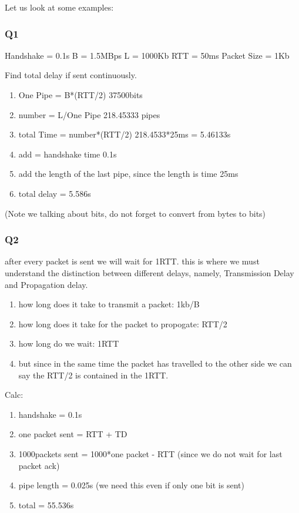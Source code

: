 \documentclass[11pt, a4paper]{article}
\begin{document}
Let us look at some examples:
\subsubsection{Q1}
Handshake = 0.1s
B = 1.5MBps
L = 1000Kb
RTT = 50ms
Packet Size = 1Kb

Find total delay if sent continuously.
\begin{enumerate}
    \item One Pipe    = B*(RTT/2) 37500bits
    \item number      = L/One Pipe 218.45333 pipes
    \item total Time  = number*(RTT/2) 218.4533*25ms = 5.46133s
    \item add         = handshake time 0.1s
    \item add the length of the last pipe, since the length is time 25ms
    \item total delay = 5.586s
\end{enumerate}
(Note we talking about bits, do not forget to convert from bytes to bits)
\subsubsection{Q2}
after every packet is sent we will wait for 1RTT.
this is where we must understand the distinction between different delays, namely, Transmission Delay and Propagation delay.
\begin{enumerate}
    \item how long does it take to transmit a packet: 1kb/B
    \item how long does it take for the packet to propogate: RTT/2
    \item how long do we wait: 1RTT
    \item but since in the same time the packet has travelled to the other side we can say the RTT/2 is contained in the 1RTT.
\end{enumerate}
Calc:
\begin{enumerate}
    \item handshake = 0.1s
    \item one packet sent = RTT + TD
    \item 1000packets sent = 1000*one packet - RTT (since we do not wait for last packet ack)
    \item pipe length = 0.025s (we need this even if only one bit is sent)
    \item total = 55.536s
\end{enumerate}
\end{document}
